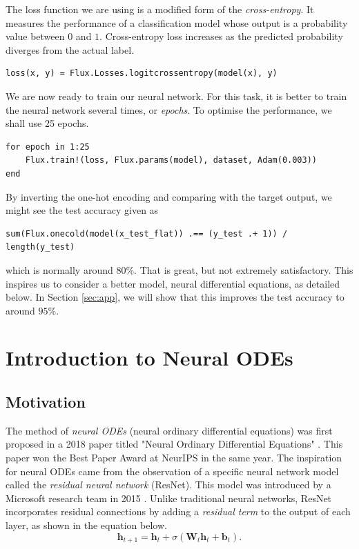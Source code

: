 \documentclass[a4paper,11pt,titlepage]{article}
\theoremstyle{definition}
\theoremstyle{plain}
\theoremstyle{remark}
\begin{document}
The loss function we are using is a modified form of the \textit{cross-entropy}. It measures the performance of a classification model whose output is a probability value between $0$ and $1$. Cross-entropy loss increases as the predicted probability diverges from the actual label.

\begin{verbatim}
loss(x, y) = Flux.Losses.logitcrossentropy(model(x), y)
\end{verbatim}

We are now ready to train our neural network. For this task, it is better to train the neural network several times, or \textit{epochs}. To optimise the performance, we shall use 25 epochs.

\begin{verbatim}
for epoch in 1:25
    Flux.train!(loss, Flux.params(model), dataset, Adam(0.003))
end
\end{verbatim}

By inverting the one-hot encoding and comparing with the target output, we might see the test accuracy given as

\begin{verbatim}
sum(Flux.onecold(model(x_test_flat)) .== (y_test .+ 1)) / length(y_test)
\end{verbatim}

which is normally around $80\%$. That is great, but not extremely satisfactory. This inspires us to consider a better model, neural differential equations, as detailed below. In Section \ref{sec:app}, we will show that this improves the test accuracy to around $95\%$.

\pagebreak
\section{Introduction to Neural ODEs}

\subsection{Motivation}

The method of \textit{neural ODEs} (neural ordinary differential equations) was first proposed in a 2018 paper titled "Neural Ordinary Differential Equations" \cite{chen2018neural}. This paper won the Best Paper Award at NeurIPS in the same year. The inspiration for neural ODEs came from the observation of a specific neural network model called the \textit{residual neural network} (ResNet). This model was introduced by a Microsoft research team in 2015 \cite{he2016deep}. Unlike traditional neural networks, ResNet incorporates residual connections by adding a \textit{residual term} to the output of each layer, as shown in the equation below.
\begin{equation}\label{eq1}
    \textbf{h}_{t+1} = \textbf{h}_t + \sigma\left(\textbf{W}_t\textbf{h}_t + \textbf{b}_t\right).\tag{1}
\end{equation}
\end{document}
